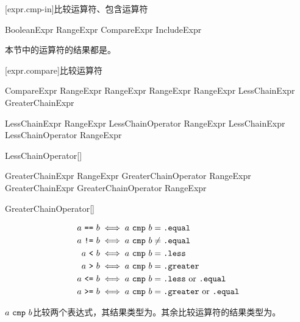 [expr.cmp-in]{比较运算符、包含运算符}

\begin{bnf}{BooleanExpr}
    RangeExpr \br
    CompareExpr \br
    IncludeExpr
\end{bnf}

\pnum
本节中的运算符的结果都是。

[expr.compare]{比较运算符}

\begin{bnf}{CompareExpr}
    RangeExpr \terminal{!=} RangeExpr \br
    RangeExpr  RangeExpr \br
    LessChainExpr \br
    GreaterChainExpr
\end{bnf}

\begin{bnf}{LessChainExpr}
    RangeExpr LessChainOperator RangeExpr \br
    LessChainExpr LessChainOperator RangeExpr
\end{bnf}

\begin{bnf}{LessChainOperator}[\oneof]
    \terminal{< == <=}
\end{bnf}

\begin{bnf}{GreaterChainExpr}
    RangeExpr GreaterChainOperator RangeExpr \br
    GreaterChainExpr GreaterChainOperator RangeExpr
\end{bnf}

\begin{bnf}{GreaterChainOperator}[\oneof]
    \terminal{> == >=}
\end{bnf}

\begin{align*}
a\ \tcode{==}\ b &\iff a\ \tcode{cmp}\ b = \tcode{.equal} \\
a\ \tcode{!=}\ b &\iff a\ \tcode{cmp}\ b \ne \tcode{.equal} \\
a\ \tcode{<}\ b &\iff a\ \tcode{cmp}\ b = \tcode{.less} \\
a\ \tcode{>}\ b &\iff a\ \tcode{cmp}\ b = \tcode{.greater} \\
a\ \tcode{<=}\ b &\iff a\ \tcode{cmp}\ b = \tcode{.less}\ \mathrm{or} \ \tcode{.equal} \\
a\ \tcode{>=}\ b &\iff a\ \tcode{cmp}\ b = \tcode{.greater}\ \mathrm{or} \ \tcode{.equal} \\
\end{align*}

\pnum
$a\ \tcode{cmp}\ b$比较两个表达式，其结果类型为。其余比较运算符的结果类型为。

